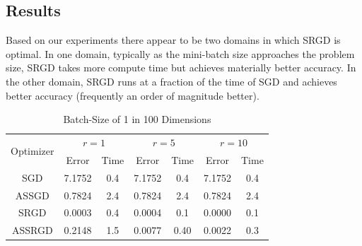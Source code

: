 \documentclass[,conference,compsoc]{IEEEtran}
\begin{document}
\subsection{Results}
Based on our experiments there appear to be two domains in which SRGD is
optimal. In one domain, typically as the mini-batch size approaches the
problem size, SRGD takes more compute time but achieves materially better
accuracy. In the other domain, SRGD runs at a fraction of the time of
SGD and achieves better accuracy (frequently an order of magnitude better).

\begin{table}[!t]
\renewcommand{\arraystretch}{1.3}
\caption{Batch-Size of 1 in 100 Dimensions}
\label{tab:d100mb1}
\centering
\begin{tabular}{|c||c|c|c|c|c|c|}
\hline
\multirow{2}{*}{Optimizer} &
    \multicolumn{2}{c}{$r = 1$} &
    \multicolumn{2}{c}{$r = 5$} &
    \multicolumn{2}{c|}{$r = 10$}\\
    & Error & Time & Error & Time & Error & Time \\
    \hline
    SGD & 7.1752 & 0.4 & 7.1752 & 0.4 & 7.1752 & 0.4\\ 
    \hline
    ASSGD & 0.7824 & 2.4 & 0.7824 & 2.4& 0.7824 & 2.4\\
    \hline
    SRGD & 0.0003 & 0.4 & 0.0004 & 0.1 & 0.0000 & 0.1\\
    \hline
    ASSRGD & 0.2148 & 1.5 & 0.0077 & 0.40 & 0.0022 & 0.3\\
\hline
\end{tabular}
\end{table}
\end{document}
